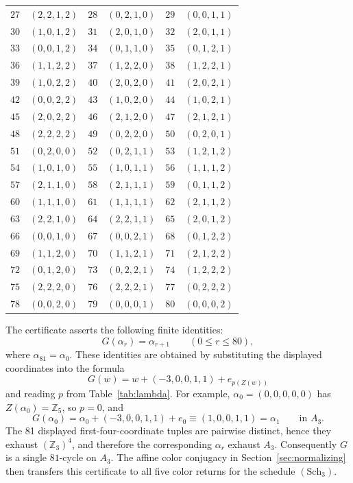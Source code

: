\documentclass[11pt]{article}
\theoremstyle{definition}
\begin{document}
\begin{longtable}{r@{\;}c@{\qquad}r@{\;}c@{\qquad}r@{\;}c}
\(27\) & \((2,2,1,2)\) & \(28\) & \((0,2,1,0)\) & \(29\) & \((0,0,1,1)\) \\
\(30\) & \((1,0,1,2)\) & \(31\) & \((2,0,1,0)\) & \(32\) & \((2,0,1,1)\) \\
\(33\) & \((0,0,1,2)\) & \(34\) & \((0,1,1,0)\) & \(35\) & \((0,1,2,1)\) \\
\(36\) & \((1,1,2,2)\) & \(37\) & \((1,2,2,0)\) & \(38\) & \((1,2,2,1)\) \\
\(39\) & \((1,0,2,2)\) & \(40\) & \((2,0,2,0)\) & \(41\) & \((2,0,2,1)\) \\
\(42\) & \((0,0,2,2)\) & \(43\) & \((1,0,2,0)\) & \(44\) & \((1,0,2,1)\) \\
\(45\) & \((2,0,2,2)\) & \(46\) & \((2,1,2,0)\) & \(47\) & \((2,1,2,1)\) \\
\(48\) & \((2,2,2,2)\) & \(49\) & \((0,2,2,0)\) & \(50\) & \((0,2,0,1)\) \\
\(51\) & \((0,2,0,0)\) & \(52\) & \((0,2,1,1)\) & \(53\) & \((1,2,1,2)\) \\
\(54\) & \((1,0,1,0)\) & \(55\) & \((1,0,1,1)\) & \(56\) & \((1,1,1,2)\) \\
\(57\) & \((2,1,1,0)\) & \(58\) & \((2,1,1,1)\) & \(59\) & \((0,1,1,2)\) \\
\(60\) & \((1,1,1,0)\) & \(61\) & \((1,1,1,1)\) & \(62\) & \((2,1,1,2)\) \\
\(63\) & \((2,2,1,0)\) & \(64\) & \((2,2,1,1)\) & \(65\) & \((2,0,1,2)\) \\
\(66\) & \((0,0,1,0)\) & \(67\) & \((0,0,2,1)\) & \(68\) & \((0,1,2,2)\) \\
\(69\) & \((1,1,2,0)\) & \(70\) & \((1,1,2,1)\) & \(71\) & \((2,1,2,2)\) \\
\(72\) & \((0,1,2,0)\) & \(73\) & \((0,2,2,1)\) & \(74\) & \((1,2,2,2)\) \\
\(75\) & \((2,2,2,0)\) & \(76\) & \((2,2,2,1)\) & \(77\) & \((0,2,2,2)\) \\
\(78\) & \((0,0,2,0)\) & \(79\) & \((0,0,0,1)\) & \(80\) & \((0,0,0,2)\) \\
\bottomrule
\end{longtable}
\endgroup

The certificate asserts the following finite identities:
\[
G(\alpha_r)=\alpha_{r+1}\qquad(0\le r\le80),
\]
where \(\alpha_{81}=\alpha_0\).  These identities are obtained by substituting the displayed
coordinates into the formula
\[
G(w)=w+(-3,0,0,1,1)+e_{p(Z(w))}
\]
and reading \(p\) from Table~\ref{tab:lambda}.  For example,
\(\alpha_0=(0,0,0,0,0)\) has \(Z(\alpha_0)=\mathbb Z_5\), so \(p=0\), and
\[
G(\alpha_0)=\alpha_0+(-3,0,0,1,1)+e_0\equiv (1,0,0,1,1)=\alpha_1\qquad\text{in }A_3.
\]
The 81 displayed first-four-coordinate tuples are pairwise distinct, hence they exhaust
\((\mathbb Z_3)^4\), and therefore the corresponding \(\alpha_r\) exhaust \(A_3\).  Consequently
\(G\) is a single \(81\)-cycle on \(A_3\).  The affine color conjugacy in Section~\ref{sec:normalizing}
then transfers this certificate to all five color returns for the schedule \((\mathrm{Sch}_3)\).
\end{document}
